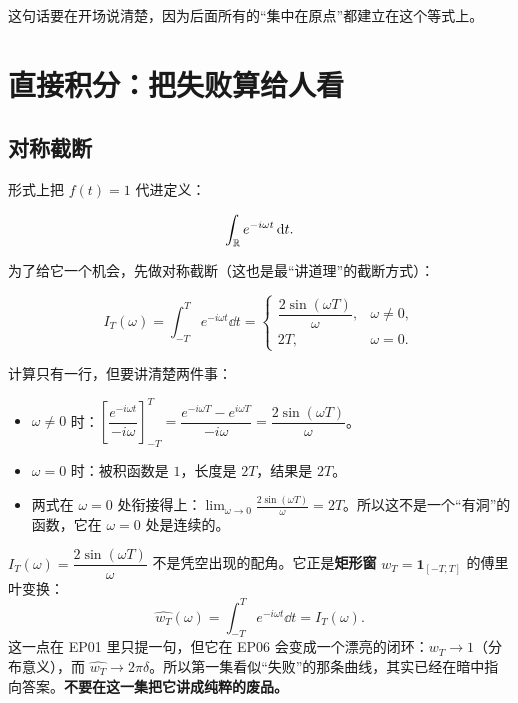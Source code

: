 这句话要在开场说清楚，因为后面所有的“集中在原点”都建立在这个等式上。

\section{直接积分：把失败算给人看}

\subsection{对称截断}

形式上把 $f(t)=1$ 代进定义：

\begin{equation}
\int_{\mathbb{R}}e^{-i\omega t}\mathop{}\!\mathrm{d} t .
\end{equation}

为了给它一个机会，先做对称截断（这也是最“讲道理”的截断方式）：

\begin{equation}
I_T(\omega)=\int_{-T}^{T}e^{-i\omega t}\dd t
=\begin{cases}
\dfrac{2\sin(\omega T)}{\omega}, & \omega\neq0,\\[9pt]
2T, & \omega=0 .
\end{cases}\label{eq:IT}
\end{equation}

计算只有一行，但要讲清楚两件事：

\begin{itemize}[leftmargin=1.6em,itemsep=0.35em]
\item $\omega\neq0$ 时：$\left[\dfrac{e^{-i\omega t}}{-i\omega}\right]_{-T}^{T}=\dfrac{e^{-i\omega T}-e^{i\omega T}}{-i\omega}=\dfrac{2\sin(\omega T)}{\omega}$。
\item $\omega=0$ 时：被积函数是 $1$，长度是 $2T$，结果是 $2T$。
\item 两式在 $\omega=0$ 处衔接得上：$\lim_{\omega\to0}\frac{2\sin(\omega T)}{\omega}=2T$。所以这不是一个“有洞”的函数，它在 $\omega=0$ 处是连续的。
\end{itemize}

\begin{ideabox}[顺带记住这个函数]
$I_T(\omega)=\dfrac{2\sin(\omega T)}{\omega}$ 不是凭空出现的配角。它正是\textbf{矩形窗} $w_T=\mathbf{1}_{[-T,T]}$ 的傅里叶变换：
\begin{equation}
\widehat{w_T}(\omega)=\int_{-T}^{T}e^{-i\omega t}\dd t=I_T(\omega).
\end{equation}
这一点在 EP01 里只提一句，但它在 EP06 会变成一个漂亮的闭环：$w_T\to1$（分布意义），而 $\widehat{w_T}\to2\pi\delta$。所以第一集看似“失败”的那条曲线，其实已经在暗中指向答案。\textbf{不要在这一集把它讲成纯粹的废品。}
\end{ideabox}

